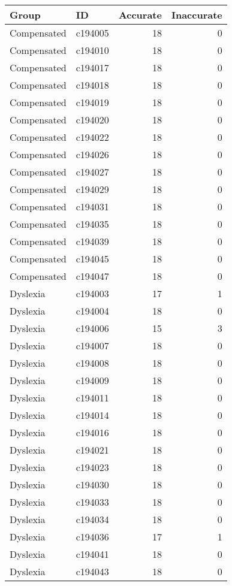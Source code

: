 \documentclass[
]{article}
\begin{document}
\begin{table}[t]
\fontsize{12.0pt}{14.4pt}\selectfont
\begin{tabular*}{\linewidth}{@{\extracolsep{\fill}}llrr}
\toprule
Group & ID & Accurate & Inaccurate \\ 
\midrule\addlinespace[2.5pt]
Compensated & c194005 & 18 & 0 \\ 
Compensated & c194010 & 18 & 0 \\ 
Compensated & c194017 & 18 & 0 \\ 
Compensated & c194018 & 18 & 0 \\ 
Compensated & c194019 & 18 & 0 \\ 
Compensated & c194020 & 18 & 0 \\ 
Compensated & c194022 & 18 & 0 \\ 
Compensated & c194026 & 18 & 0 \\ 
Compensated & c194027 & 18 & 0 \\ 
Compensated & c194029 & 18 & 0 \\ 
Compensated & c194031 & 18 & 0 \\ 
Compensated & c194035 & 18 & 0 \\ 
Compensated & c194039 & 18 & 0 \\ 
Compensated & c194045 & 18 & 0 \\ 
Compensated & c194047 & 18 & 0 \\ 
Dyslexia & c194003 & 17 & 1 \\ 
Dyslexia & c194004 & 18 & 0 \\ 
Dyslexia & c194006 & 15 & 3 \\ 
Dyslexia & c194007 & 18 & 0 \\ 
Dyslexia & c194008 & 18 & 0 \\ 
Dyslexia & c194009 & 18 & 0 \\ 
Dyslexia & c194011 & 18 & 0 \\ 
Dyslexia & c194014 & 18 & 0 \\ 
Dyslexia & c194016 & 18 & 0 \\ 
Dyslexia & c194021 & 18 & 0 \\ 
Dyslexia & c194023 & 18 & 0 \\ 
Dyslexia & c194030 & 18 & 0 \\ 
Dyslexia & c194033 & 18 & 0 \\ 
Dyslexia & c194034 & 18 & 0 \\ 
Dyslexia & c194036 & 17 & 1 \\ 
Dyslexia & c194041 & 18 & 0 \\ 
Dyslexia & c194043 & 18 & 0 \\ 

\end{tabular*}
\end{table}
\end{document}
